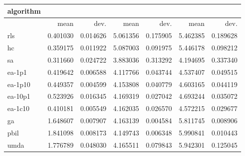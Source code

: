 \begin{tabular}{@{}l*{6}{>{{}}N{1}{2}}@{}}
\toprule
{algorithm} &  &  &  \\
\midrule
& {mean} & {dev.} & {mean} & {dev.} & {mean} & {dev.} \\
\midrule
rls & 0.401030 & 0.014626 & 5.061356 & 0.175905 & 5.462385 & 0.189628 \\
 hc & 0.359175 & 0.011922 & 5.087003 & 0.091975 & 5.446178 & 0.098212 \\
 sa & 0.311660 & 0.024722 & 3.883036 & 0.313292 & 4.194695 & 0.337340 \\
 ea-1p1 & 0.419642 & 0.006588 & 4.117766 & 0.043744 & 4.537407 & 0.049515 \\
 ea-1p10 & 0.449357 & 0.004599 & 4.153808 & 0.040779 & 4.603165 & 0.044119 \\
 ea-10p1 & 0.523926 & 0.016345 & 4.169319 & 0.027042 & 4.693244 & 0.035072 \\
 ea-1c10 & 0.410181 & 0.005549 & 4.162035 & 0.026570 & 4.572215 & 0.029677 \\
 ga & 1.648607 & 0.007907 & 4.163139 & 0.004584 & 5.811745 & 0.008906 \\
 pbil & 1.841098 & 0.008173 & 4.149743 & 0.006348 & 5.990841 & 0.010443 \\
 umda & 1.776789 & 0.048030 & 4.165511 & 0.079843 & 5.942301 & 0.125045 \\
 \bottomrule
\end{tabular}
